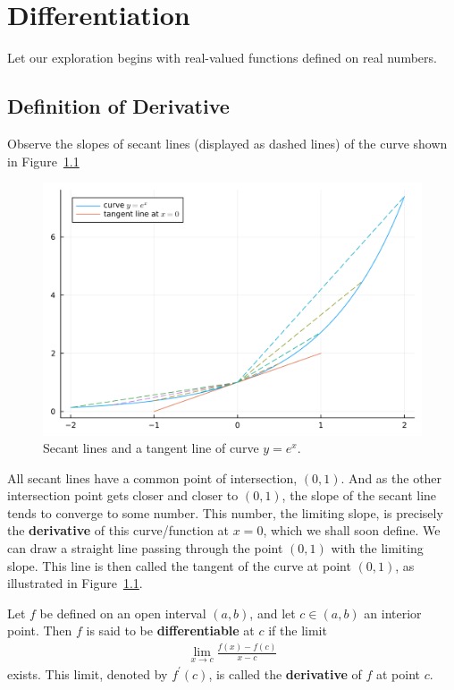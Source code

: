 \documentclass[thmcnt=section, 12pt]{my-elegantbook}
\begin{document}
\chapter{Differentiation}

Let our exploration begins with real-valued functions defined on real numbers.


\section{Definition of Derivative}

Observe the slopes of secant lines (displayed as dashed lines) of the curve shown in Figure~\ref{fig:1}

\begin{figure}[H]
    \centering
    \includegraphics[scale=0.2]{figures/secant-lines-and-a-tangent-line.png}
    \caption{Secant lines and a tangent line of curve $y=e^x$.}
    \label{fig:1}
\end{figure}

\noindent All secant lines have a common point of intersection, $(0, 1)$. And as the other intersection point gets closer and closer to $(0, 1)$, the slope of the secant line tends to converge to some number. This number, the limiting slope, is precisely the \textbf{derivative} of this curve/function at $x=0$, which we shall soon define. We can draw a straight line passing through the point $(0,1)$ with the limiting slope. This line is then called the tangent of the curve at point $(0,1)$, as illustrated in Figure~\ref{fig:1}. 

\begin{definition}
    Let $f$ be defined on an open interval $(a, b)$, and let $c \in (a, b)$ an interior point. Then $f$ is said to be \textbf{differentiable} at $c$ if the limit 
    \begin{align*}
        \lim_{x \to c} \frac{f(x) - f(c)}{x - c}        
    \end{align*}
    exists. This limit, denoted by $f^\prime(c)$, is called the \textbf{derivative}  of $f$ at point $c$.
\end{definition}
\end{document}
